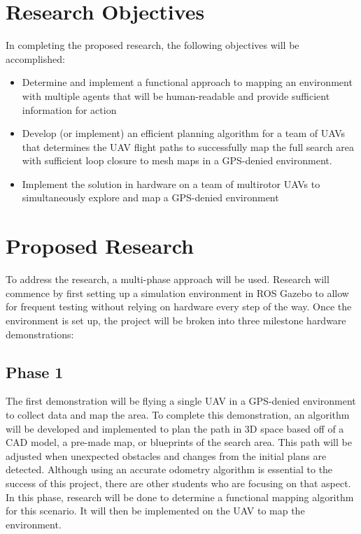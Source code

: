 \documentclass[12pt, letterpaper]{article}
\begin{document}
\section{Research Objectives}

In completing the proposed research, the following objectives will be accomplished:


\begin{itemize}
	
	\item Determine and implement a functional approach to mapping an environment with multiple agents that will be human-readable and provide sufficient information for action

	\item Develop (or implement) an efficient planning algorithm for a team of UAVs that determines the UAV flight paths to successfully map the full search area with sufficient loop closure to mesh maps in a GPS-denied environment. 

	\item Implement the solution in hardware on a team of multirotor UAVs to simultaneously explore and map a GPS-denied environment


\end{itemize}

\section{Proposed Research}

To address the research, a multi-phase approach will be used. Research will commence by first setting up a simulation environment in ROS Gazebo to allow for frequent testing without relying on hardware every step of the way. Once the environment is set up, the project will be broken into three milestone hardware demonstrations: 

\subsection{Phase 1}
The first demonstration will be flying a single UAV in a GPS-denied environment to collect data and map the area. To complete this demonstration, an algorithm will be developed and implemented to plan the path in 3D space based off of a CAD model, a pre-made map, or blueprints of the search area. This path will be adjusted when unexpected obstacles and changes from the initial plans are detected. Although using an accurate odometry algorithm is essential to the success of this project, there are other students who are focusing on that aspect. In this phase, research will be done to determine a functional mapping algorithm for this scenario. It will then be implemented on the UAV to map the environment. 
\end{document}
